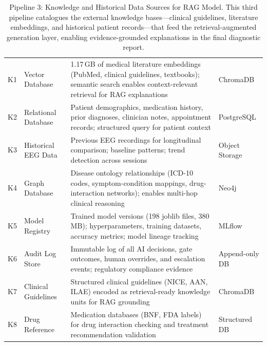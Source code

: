 {\tablestripes\tablefontsize

\begin{xltabular}{\textwidth}{@{} >{\raggedright\arraybackslash}p{1.0cm} >{\raggedright\arraybackslash}p{2.9cm} p{7.9cm} >{\raggedright\arraybackslash}p{2.3cm} @{}}
\caption[Pipeline 3: Knowledge and Historical Data Sources for]{Pipeline 3: Knowledge and Historical Data Sources for RAG Model. This third pipeline catalogues the external knowledge bases---clinical guidelines, literature embeddings, and historical patient records---that feed the retrieval-augmented generation layer, enabling evidence-grounded explanations in the final diagnostic report.}\label{tab:knowledge_pipeline} \\
\toprule
\thead{\#} &  &  &  \\
\midrule
\endfirsthead
\endhead
\bottomrule
\endlastfoot
K1 & Vector Database & 1.17\,GB of medical literature embeddings (PubMed, clinical guidelines, textbooks); semantic search enables context-relevant retrieval for RAG explanations & ChromaDB \\
\addlinespace
K2 & Relational Database & Patient demographics, medication history, prior diagnoses, clinician notes, appointment records; structured query for patient context & PostgreSQL \\
\addlinespace
K3 & Historical EEG Data & Previous EEG recordings for longitudinal comparison; baseline patterns; trend detection across sessions & Object Storage \\
\addlinespace
K4 & Graph Database & Disease ontology relationships (ICD-10 codes, symptom-condition mappings, drug-interaction networks); enables multi-hop clinical reasoning & Neo4j \\
\addlinespace
K5 & Model Registry & Trained model versions (198 joblib files, 380\,MB); hyperparameters, training datasets, accuracy metrics; model lineage tracking & MLflow \\
\addlinespace
K6 & Audit Log Store & Immutable log of all AI decisions, gate outcomes, human overrides, and escalation events; regulatory compliance evidence & Append-only DB \\
\addlinespace
K7 & Clinical Guidelines & Structured clinical guidelines (NICE, AAN, ILAE) encoded as retrieval-ready knowledge units for RAG grounding & ChromaDB \\
\addlinespace
K8 & Drug Reference & Medication databases (BNF, FDA labels) for drug interaction checking and treatment recommendation validation & Structured DB \\
\end{xltabular}}
